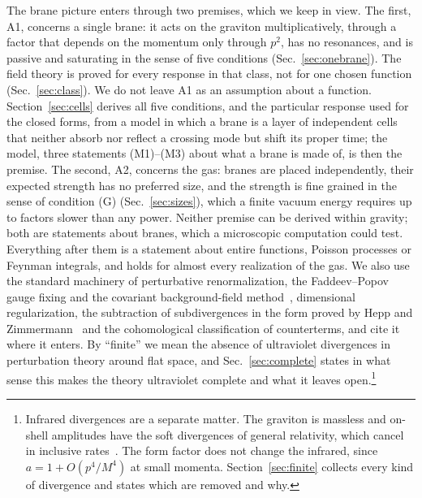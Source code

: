 \documentclass[aps,prd,10pt,twocolumn,superscriptaddress,nofootinbib,floatfix,longbibliography]{revtex4-2}
\begin{document}
The brane picture enters through two premises, which we keep in view. The first, A1, concerns a single brane: it acts on the graviton multiplicatively, through a factor that depends on the momentum only through $p^2$, has no resonances, and is passive and saturating in the sense of five conditions (Sec.~\ref{sec:onebrane}). The field theory is proved for every response in that class, not for one chosen function (Sec.~\ref{sec:class}). We do not leave A1 as an assumption about a function. Section~\ref{sec:cells} derives all five conditions, and the particular response used for the closed forms, from a model in which a brane is a layer of independent cells that neither absorb nor reflect a crossing mode but shift its proper time; the model, three statements (M1)--(M3) about what a brane is made of, is then the premise. The second, A2, concerns the gas: branes are placed independently, their expected strength has no preferred size, and the strength is fine grained in the sense of condition (G) (Sec.~\ref{sec:sizes}), which a finite vacuum energy requires up to factors slower than any power. Neither premise can be derived within gravity; both are statements about branes, which a microscopic computation could test. Everything after them is a statement about entire functions, Poisson processes or Feynman integrals, and holds for almost every realization of the gas. We also use the standard machinery of perturbative renormalization, the Faddeev--Popov gauge fixing and the covariant background-field method~\cite{FaddeevPopov1967,DeWitt1967}, dimensional regularization, the subtraction of subdivergences in the form proved by Hepp and Zimmermann~\cite{Hepp1966,Zimmermann1969} and the cohomological classification of counterterms, and cite it where it enters. By ``finite'' we mean the absence of ultraviolet divergences in perturbation theory around flat space, and Sec.~\ref{sec:complete} states in what sense this makes the theory ultraviolet complete and what it leaves open.\footnote{Infrared divergences are a separate matter. The graviton is massless and on-shell amplitudes have the soft divergences of general relativity, which cancel in inclusive rates~\cite{Weinberg1965}. The form factor does not change the infrared, since $a=1+O(p^4/M^4)$ at small momenta. Section~\ref{sec:finite} collects every kind of divergence and states which are removed and why.}
\end{document}
